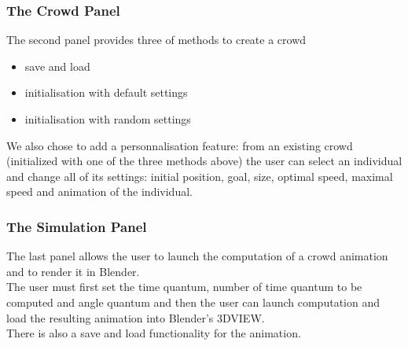 \subsubsection{The Crowd Panel}
The second panel provides three of methods to create a crowd 
\begin{itemize}
\item save and load
\item initialisation with default settings
\item initialisation with random settings
\end{itemize}

We also chose to add a personnalisation feature: from an existing crowd (initialized with one of the three methods above) the user can select an individual and change all of its settings: initial position, goal, size, optimal speed, maximal speed and animation of the individual.


\subsubsection{The Simulation Panel}
The last panel allows the user to launch the computation of a crowd animation and to render it in Blender.\\
The user must first set the time quantum, number of time quantum to be computed and angle quantum and then the user can launch computation and load the resulting animation into Blender's 3DVIEW.\\
There is also a save and load functionality for the animation.


